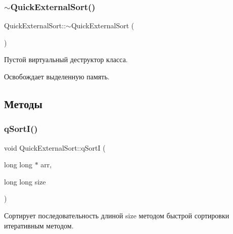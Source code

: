 \subsubsection{\texorpdfstring{$\sim$\+Quick\+External\+Sort()}{~QuickExternalSort()}}
{\footnotesize\ttfamily Quick\+External\+Sort\+::$\sim$\+Quick\+External\+Sort (\begin{DoxyParamCaption}{ }\end{DoxyParamCaption})}



Пустой виртуальный деструктор класса. 

Освобождает выделенную память. 

\subsection{Методы}
\hypertarget{class_quick_external_sort_ad7653bb697a04717066f9942db9a4597}{}\label{class_quick_external_sort_ad7653bb697a04717066f9942db9a4597} 
\subsubsection{\texorpdfstring{q\+Sort\+I()}{qSortI()}}
{\footnotesize\ttfamily void Quick\+External\+Sort\+::q\+SortI (\begin{DoxyParamCaption}\item[{long long $\ast$}]{arr,  }\item[{long long}]{size }\end{DoxyParamCaption})\hspace{0.3cm}{\ttfamily [private]}}



Сортирует последовательность длиной size методом быстрой сортировки итеративным методом. 



